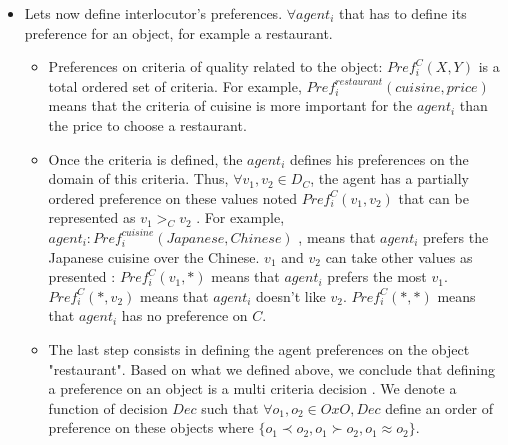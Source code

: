 \documentclass{llncs}
\begin{document}
\begin{itemize}
 \item Lets now define interlocutor's preferences. $\forall agent_{i}$ that has to define its preference for an object, for example a restaurant.
 \begin{itemize}
 \item Preferences on criteria of quality related to the object: $Pref_{i}^C (X,Y) $ is a total ordered set of criteria. For example, $ Pref_{i}^{restaurant} (cuisine,price)$ means that the criteria of cuisine is more important for the $agent_{i}$  than the price to choose a restaurant. 
 \item Once the criteria is defined, the $agent_{i}$ defines his preferences on the domain of this criteria. Thus, $\forall v_{1} , v_{2} \in D_{C}$, the agent has a  partially ordered preference on these values noted $Pref_{i}^C (v_{1}, v_{2})$  that can be represented as $v_{1}>_{C} v_{2}$ . For example, $agent_{i}:  Pref_{i}^{cuisine} (Japanese , Chinese)$ , means that  $agent_{i}$ prefers the Japanese cuisine over the Chinese. $v_{1} $ and $ v_{2}$ can take other values as presented : 
 \subitem $Pref_{i}^C (v_{1}, *)$ means that $agent_{i}$ prefers the most $v_{1}$. 
 \subitem $Pref_{i}^C (*,v_{2})$ means that $agent_{i}$ doesn't like  $v_{2}$. 
 \subitem $Pref_{i}^C (*,*)$ means that $agent_{i}$ has no preference on $C$. 
 \item The last step consists in defining the agent preferences on the object "restaurant". Based on what we defined above, we conclude that defining a preference on an object is a multi criteria decision \cite{figueira2005multiple}. We denote a function of decision  $Dec$ such that $\forall o_{1}, o_{2} \in O x O, Dec$ define an order of preference on these objects where  $\{o_{1}\prec o_{2}, o_{1} \succ o_{2}, o_{1} \approx o_{2}\}$.
 \end{itemize} 
 \end{itemize}
 
\end{document}

